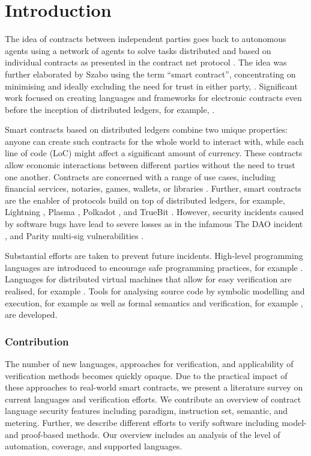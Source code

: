 \section{Introduction}
The idea of contracts between independent parties goes back to autonomous agents using a network of agents to solve tasks distributed and based on individual contracts as presented in the contract net protocol  \cite{Smith1980}.
The idea was further elaborated by Szabo using the term ``smart contract'', concentrating on minimising and ideally excluding the need for trust in either party,  \cite{Szabo1997}.
Significant work focused on creating languages and frameworks for electronic contracts even before the inception of distributed ledgers, for example, \cite{Andersen2006,Kyas2008,Xu2004}.


Smart contracts based on distributed ledgers combine two unique properties: anyone can create such contracts for the whole world to interact with, while each line of code (LoC) might affect a significant amount of currency.
These contracts allow economic interactions between different parties without the need to trust one another.
Contracts are concerned with a range of use cases, including financial services, notaries, games, wallets, or libraries \cite{Bartoletti2017}.
Further, smart contracts are the enabler of protocols build on top of distributed ledgers, for example, Lightning \cite{Poon2016}, Plasma \cite{Poon2017}, Polkadot \cite{Wood2017}, and TrueBit \cite{Teutsch2017}.
However, security incidents caused by software bugs have lead to severe losses as in the infamous The DAO incident \cite{Daian2016}, and Parity multi-sig vulnerabilities \cite{Breidenbach2017Parity,ParityTech2017}. 


Substantial efforts are taken to prevent future incidents. 
High-level programming languages are introduced to encourage safe programming practices, for example  \cite{Hirai2018Bamboo,Ethereum2018Vyper,Schrans2018}.
Languages for distributed virtual machines that allow for easy verification are realised, for example \cite{Sergey2018,DynamicLedgerSolutions2017,Popejoy2017,Kasampalis2018}.
Tools for analysing source code by symbolic modelling and execution, for example \cite{Luu2016,Tsankov2017,Kalra2018,Albert2018} as well as formal semantics and verification, for example \cite{Bhargavan2016,Hildenbrandt2017,Hirai2017}, are developed.

\subsubsection{Contribution} The number of new languages, approaches for verification, and applicability of verification methods becomes quickly opaque. Due to the practical impact of these approaches to real-world smart contracts, we present a literature survey on current languages and verification efforts.
We contribute an overview of contract language security features including paradigm, instruction set, semantic, and metering.
Further, we describe different efforts to verify software including model- and proof-based methods. Our overview includes an analysis of the level of automation, coverage, and supported languages.

